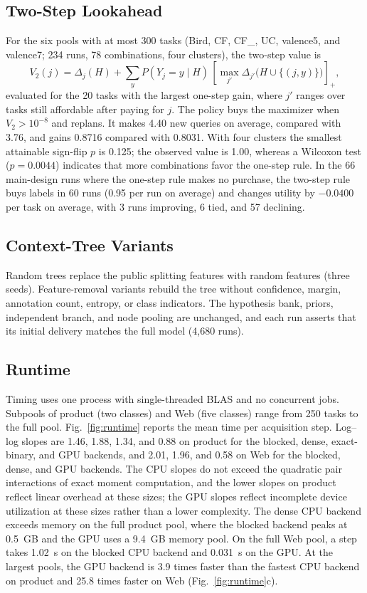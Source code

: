 \documentclass[journal]{IEEEtran}
\newcommand{\pos}[1]{[#1]_+}
\begin{document}
\subsection{Two-Step Lookahead}
For the six pools with at most 300 tasks (Bird, CF, CF\_, UC, valence5, and valence7; 234 runs, 78 combinations, four clusters), the two-step value is
\begin{equation}
 V_2(j)=\Delta_j(H)+\sum_y P(Y_j=y\mid H)\,\pos{\max_{j'}\Delta_{j'}\big(H\cup\{(j,y)\}\big)},
\end{equation}
evaluated for the 20 tasks with the largest one-step gain, where $j'$ ranges over tasks still affordable after paying for $j$. The policy buys the maximizer when $V_2>10^{-8}$ and replans. It makes 4.40 new queries on average, compared with 3.76, and gains 0.8716 compared with 0.8031. With four clusters the smallest attainable sign-flip $p$ is 0.125; the observed value is 1.00, whereas a Wilcoxon test ($p=0.0044$) indicates that more combinations favor the one-step rule. In the 66 main-design runs where the one-step rule makes no purchase, the two-step rule buys labels in 60 runs (0.95 per run on average) and changes utility by $-0.0400$ per task on average, with 3 runs improving, 6 tied, and 57 declining.

\subsection{Context-Tree Variants}
Random trees replace the public splitting features with random features (three seeds). Feature-removal variants rebuild the tree without confidence, margin, annotation count, entropy, or class indicators. The hypothesis bank, priors, independent branch, and node pooling are unchanged, and each run asserts that its initial delivery matches the full model (4,680 runs).

\subsection{Runtime}
Timing uses one process with single-threaded BLAS and no concurrent jobs. Subpools of product (two classes) and Web (five classes) range from 250 tasks to the full pool. Fig.~\ref{fig:runtime} reports the mean time per acquisition step. Log--log slopes are 1.46, 1.88, 1.34, and 0.88 on product for the blocked, dense, exact-binary, and GPU backends, and 2.01, 1.96, and 0.58 on Web for the blocked, dense, and GPU backends. The CPU slopes do not exceed the quadratic pair interactions of exact moment computation, and the lower slopes on product reflect linear overhead at these sizes; the GPU slopes reflect incomplete device utilization at these sizes rather than a lower complexity. The dense CPU backend exceeds memory on the full product pool, where the blocked backend peaks at 0.5~GB and the GPU uses a 9.4~GB memory pool. On the full Web pool, a step takes 1.02~s on the blocked CPU backend and 0.031~s on the GPU.  At the largest pools, the GPU backend is 3.9 times faster than the fastest CPU backend on product and 25.8 times faster on Web (Fig.~\ref{fig:runtime}c).
\end{document}
